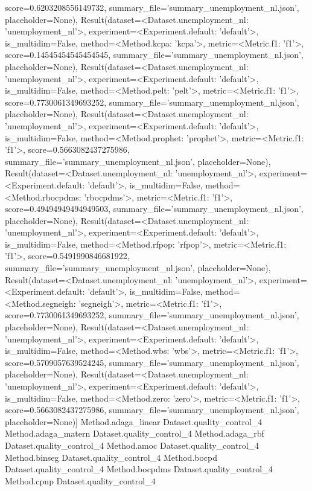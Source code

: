 score=0.6203208556149732, summary_file='summary_unemployment_nl.json', placeholder=None), Result(dataset=<Dataset.unemployment_nl: 'unemployment_nl'>, experiment=<Experiment.default: 'default'>, is_multidim=False, method=<Method.kcpa: 'kcpa'>, metric=<Metric.f1: 'f1'>, score=0.14545454545454545, summary_file='summary_unemployment_nl.json', placeholder=None), Result(dataset=<Dataset.unemployment_nl: 'unemployment_nl'>, experiment=<Experiment.default: 'default'>, is_multidim=False, method=<Method.pelt: 'pelt'>, metric=<Metric.f1: 'f1'>, score=0.7730061349693252, summary_file='summary_unemployment_nl.json', placeholder=None), Result(dataset=<Dataset.unemployment_nl: 'unemployment_nl'>, experiment=<Experiment.default: 'default'>, is_multidim=False, method=<Method.prophet: 'prophet'>, metric=<Metric.f1: 'f1'>, score=0.5663082437275986, summary_file='summary_unemployment_nl.json', placeholder=None), Result(dataset=<Dataset.unemployment_nl: 'unemployment_nl'>, experiment=<Experiment.default: 'default'>, is_multidim=False, method=<Method.rbocpdms: 'rbocpdms'>, metric=<Metric.f1: 'f1'>, score=0.49494949494949503, summary_file='summary_unemployment_nl.json', placeholder=None), Result(dataset=<Dataset.unemployment_nl: 'unemployment_nl'>, experiment=<Experiment.default: 'default'>, is_multidim=False, method=<Method.rfpop: 'rfpop'>, metric=<Metric.f1: 'f1'>, score=0.5491990846681922, summary_file='summary_unemployment_nl.json', placeholder=None), Result(dataset=<Dataset.unemployment_nl: 'unemployment_nl'>, experiment=<Experiment.default: 'default'>, is_multidim=False, method=<Method.segneigh: 'segneigh'>, metric=<Metric.f1: 'f1'>, score=0.7730061349693252, summary_file='summary_unemployment_nl.json', placeholder=None), Result(dataset=<Dataset.unemployment_nl: 'unemployment_nl'>, experiment=<Experiment.default: 'default'>, is_multidim=False, method=<Method.wbs: 'wbs'>, metric=<Metric.f1: 'f1'>, score=0.5709057639524245, summary_file='summary_unemployment_nl.json', placeholder=None), Result(dataset=<Dataset.unemployment_nl: 'unemployment_nl'>, experiment=<Experiment.default: 'default'>, is_multidim=False, method=<Method.zero: 'zero'>, metric=<Metric.f1: 'f1'>, score=0.5663082437275986, summary_file='summary_unemployment_nl.json', placeholder=None)]
Method.adaga_linear Dataset.quality_control_4
Method.adaga_matern Dataset.quality_control_4
Method.adaga_rbf Dataset.quality_control_4
Method.amoc Dataset.quality_control_4
Method.binseg Dataset.quality_control_4
Method.bocpd Dataset.quality_control_4
Method.bocpdms Dataset.quality_control_4
Method.cpnp Dataset.quality_control_4
